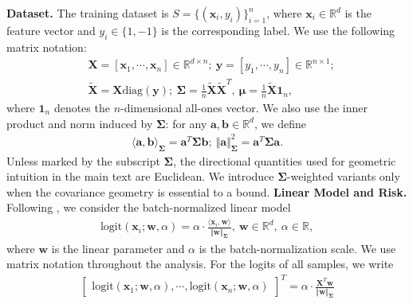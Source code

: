 \documentclass[pdflatex,sn-basic]{sn-jnl}%
\theoremstyle{thmstyleone}%
\begin{document}
\noindent\textbf{Dataset.}
The training dataset is $S = \{(\mathbf{x}_i, y_i)\}_{i=1}^{n}$, 
where $\mathbf{x}_i \in \mathbb{R}^{d}$ is the feature vector and $y_i \in \{1, -1\}$ is the corresponding label. 
We use the following matrix notation:
\begin{equation*}
\begin{aligned}
  & \mathbf{X} = [\mathbf{x}_1, \cdots, \mathbf{x}_n] \in \mathbb{R}^{d \times n}; \ 
  \mathbf{y} = [y_1, \cdots, y_n] \in \mathbb{R}^{n \times 1}; 
  \\ & 
  \tilde{\mathbf{X}} = \mathbf{X} \text{diag}\left(\mathbf{y}\right); \ 
  \mathbf{\Sigma} = \frac{1}{n} \tilde{\mathbf{X}} \tilde{\mathbf{X}}^T, \ 
  \boldsymbol{\mu} = \frac{1}{n} \tilde{\mathbf{X}} \mathbf{1}_{n},
\end{aligned}
\end{equation*}
where $\mathbf{1}_{n}$ denotes the $n$-dimensional all-ones vector. 
We also use the inner product and norm induced by $\mathbf{\Sigma}$:
for any $\mathbf{a}, \mathbf{b} \in \mathbb{R}^{d}$, we define
\begin{equation*}
\begin{aligned}
  \langle \mathbf{a}, \mathbf{b} \rangle_{\mathbf{\Sigma}} = \mathbf{a}^T \mathbf{\Sigma} \mathbf{b}; \ 
  \Vert \mathbf{a} \Vert_{\mathbf{\Sigma}}^2 = \mathbf{a}^T \mathbf{\Sigma} \mathbf{a}. 
\end{aligned}
\end{equation*}
Unless marked by the subscript $\mathbf{\Sigma}$, the directional quantities used for geometric intuition in the main text are Euclidean. We introduce $\mathbf{\Sigma}$-weighted variants only when the covariance geometry is essential to a bound.
\noindent\textbf{ Linear Model and Risk.}
Following \citet{implicit_bias_BN}, we consider the batch-normalized linear model
\begin{equation*}
\begin{aligned}
  \text{logit} \left(\mathbf{x}_i; \mathbf{w}, \alpha \right) = 
  \alpha \cdot \frac{\langle \mathbf{x}_i, \mathbf{w} \rangle }{\Vert \mathbf{w} \Vert_{\mathbf{\Sigma}}},
  \ \mathbf{w} \in \mathbb{R}^{d}, 
  \ \alpha \in \mathbb{R},
\end{aligned}
\end{equation*}
where $\mathbf{w}$ is the linear parameter and $\alpha$ is the batch-normalization scale. 
We use matrix notation throughout the analysis. For the logits of all samples, we write
\begin{equation*}
\begin{aligned}
  \left[\begin{array}{ccccccc}
    \text{logit} \left(\mathbf{x}_1; \mathbf{w}, \alpha \right),
    \cdots,
    \text{logit} \left(\mathbf{x}_n; \mathbf{w}, \alpha \right)
  \end{array}\right]^T
  =
  \alpha \cdot \frac{\mathbf{X}^T \mathbf{w}}{\Vert \mathbf{w} \Vert_{\mathbf{\Sigma}}}
\end{aligned}
\end{equation*}
\end{document}
